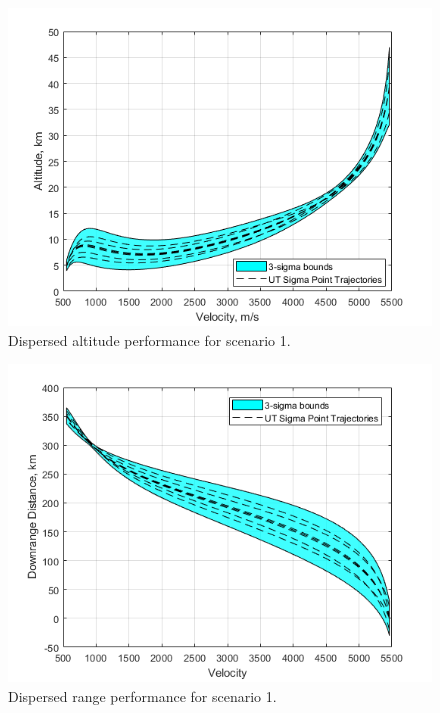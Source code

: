 \documentclass[journal ]{new-aiaa}
\begin{document}
\begin{figure}[h!]
	\centering
	\includegraphics[width=1\textwidth]{ddp/matlab/RobustTrajAlt}
	\caption{Dispersed altitude performance for scenario 1.}
	\label{fig_robust_alt}
\end{figure}
\begin{figure}[h!]
	\centering
	\includegraphics[width=1\textwidth]{ddp/matlab/RobustTrajRange}
	\caption{Dispersed range performance for scenario 1.}
	\label{fig_robust_range}
\end{figure}
\end{document}
